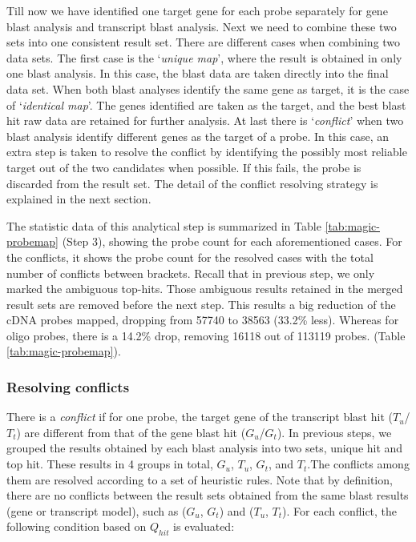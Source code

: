 Till now we have identified one target gene for each probe separately for gene blast analysis and transcript blast analysis. Next we need to combine these two sets into one consistent result set.  There are different cases when combining two data sets. The first case is the `\textit{unique map}', where the result is obtained in only one blast analysis. In this case, the blast data are taken directly into the final data set. When both blast analyses identify the same gene as target, it is the case of `\textit{identical map}'. The genes identified are taken as the target, and the best blast hit raw data are retained for further analysis. At last there is `\textit{conflict}' when two blast analysis identify different genes as the target of a probe.  In this case, an extra step is taken to resolve the conflict by identifying the possibly most reliable target out of the two candidates when possible. If this fails, the probe is discarded from the result set. The detail of the conflict resolving strategy is explained in the next section.

The statistic data of this analytical step is summarized in Table \ref{tab:magic-probemap} (Step 3), showing the probe count for each aforementioned cases. For the conflicts, it shows the probe count for the resolved cases with the total number of conflicts between brackets. Recall that in previous step, we only marked the ambiguous top-hits. Those ambiguous results retained in the merged result sets are removed before the next step. This results a big reduction of the cDNA probes mapped, dropping from 57740 to 38563 (33.2\% less). Whereas for oligo probes, there is a 14.2\% drop, removing 16118 out of 113119 probes. (Table \ref{tab:magic-probemap}).


\subsubsection{Resolving conflicts}\label{apd:magic-conflict}

There is a \textit{conflict} if for one probe, the target gene of the transcript blast hit ($T_u$/$T_t$) are different from that of the gene blast hit ($G_u$/$G_t$). In previous steps, we grouped the results obtained by each blast analysis into two sets, unique hit and top hit. These results in 4 groups in total, $G_u$, $T_u$, $G_t$, and $T_t$.The conflicts among them are resolved according to a set of heuristic rules. Note that by definition, there are no conflicts between the result sets obtained from the same blast results (gene or transcript model), such as ($G_u$, $G_t$) and ($T_u$, $T_t$). For each conflict, the following condition based on $Q_{hit}$ is evaluated: 

